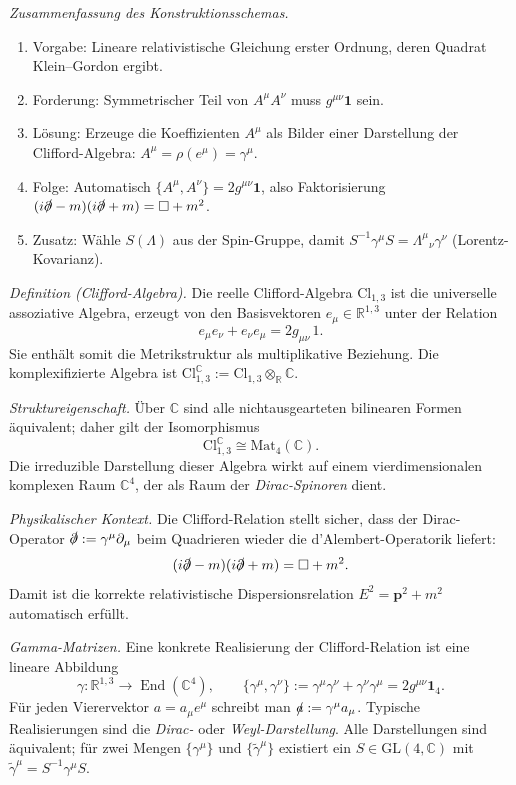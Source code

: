 \documentclass[10pt, letterpaper]{article}
\newcommand{\R}{\mathbb{R}}
\newcommand{\C}{\mathbb{C}}
\newcommand{\Cl}{\mathrm{Cl}}
\newcommand{\GL}{\mathrm{GL}}
\newcommand{\Mat}{\mathrm{Mat}}
\begin{document}
\emph{Zusammenfassung des Konstruktionsschemas.}
\begin{enumerate}\itemsep0.3ex
\item Vorgabe: Lineare relativistische Gleichung erster Ordnung, deren Quadrat Klein--Gordon ergibt.
\item Forderung: Symmetrischer Teil von $A^\mu A^\nu$ muss $g^{\mu\nu}\mathbf 1$ sein.
\item Lösung: Erzeuge die Koeffizienten $A^\mu$ als Bilder einer Darstellung der Clifford-Algebra: $A^\mu=\rho(e^\mu)=\gamma^\mu$.
\item Folge: Automatisch $\{A^\mu,A^\nu\}=2g^{\mu\nu}\mathbf 1$, also Faktorisierung $(i\slashed{\partial}-m)(i\slashed{\partial}+m)=\Box+m^2$.
\item Zusatz: Wähle $S(\Lambda)$ aus der Spin-Gruppe, damit $S^{-1}\gamma^\mu S=\Lambda^\mu{}_\nu \gamma^\nu$ (Lorentz-Kovarianz).
\end{enumerate}

\emph{Definition (Clifford-Algebra).}
Die reelle Clifford-Algebra $\Cl_{1,3}$ ist die universelle assoziative Algebra, erzeugt von den Basisvektoren \( e_\mu \in \R^{1,3} \) unter der Relation
\[
e_\mu e_\nu + e_\nu e_\mu = 2 g_{\mu\nu}\,1 .
\]
Sie enthält somit die Metrikstruktur als multiplikative Beziehung.
Die komplexifizierte Algebra ist $\Cl_{1,3}^{\C} := \Cl_{1,3}\otimes_\R \C$.

\emph{Struktureigenschaft.}
Über $\C$ sind alle nichtausgearteten bilinearen Formen äquivalent;
daher gilt der Isomorphismus
\[
\Cl_{1,3}^{\C} \cong \Mat_{4}(\C).
\]
Die irreduzible Darstellung dieser Algebra wirkt auf einem
vierdimensionalen komplexen Raum $\C^4$, der als Raum der \emph{Dirac-Spinoren} dient.

\emph{Physikalischer Kontext.}
Die Clifford-Relation stellt sicher, dass der Dirac-Operator
\(
\slashed{\partial} := \gamma^\mu \partial_\mu
\)
beim Quadrieren wieder die d’Alembert-Operatorik liefert:
\[
(i\slashed{\partial}-m)(i\slashed{\partial}+m)=\Box+m^2.
\]
Damit ist die korrekte relativistische Dispersionsrelation
\(E^2 = \mathbf p^2 + m^2\) automatisch erfüllt.

\emph{Gamma-Matrizen.}
Eine konkrete Realisierung der Clifford-Relation ist eine lineare Abbildung
\[
\gamma:\R^{1,3}\to \operatorname{End}(\C^4),\qquad 
\{\gamma^\mu,\gamma^\nu\} := \gamma^\mu\gamma^\nu+\gamma^\nu\gamma^\mu = 2 g^{\mu\nu}\mathbf 1_4 .
\]
Für jeden Vierervektor $a=a_\mu e^\mu$ schreibt man $\slashed{a}:=\gamma^\mu a_\mu$.
Typische Realisierungen sind die \emph{Dirac-} oder \emph{Weyl-Darstellung}.
Alle Darstellungen sind äquivalent; für zwei Mengen $\{\gamma^\mu\}$ und
$\{\tilde\gamma^\mu\}$ existiert ein $S\in\GL(4,\C)$ mit
$\tilde\gamma^\mu = S^{-1}\gamma^\mu S$.
\end{document}
